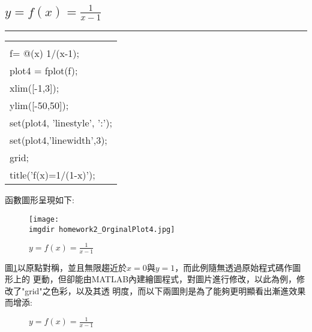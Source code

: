 		\subsection{$y=f(x)=\frac{1}{x-1}$}%
		\rule{\textwidth}{0.2pt}
		\begin{center}\colorbox{slight}{
				\begin{tabular}{p{}}
					\MJHmarker{\textbf{MATLAB語法 :}}\\					
					f= @(x) 1/(x-1);\\
					plot4 = fplot(f);\\
					xlim([-1,3]);\\
					ylim([-50,50]);\\
					set(plot4, 'linestyle', ':'); \\
					set(plot4,'linewidth',3);\\
					grid;\\
					title('f(x)=1/(1-x)');\\
				\end{tabular}
			}
			\end{center}			
		\bigskip
		函數圖形呈現如下:	
		\begin{figure}[H]	
		 	 \centering	 			 	 
   			 \texttt{[image: \\imgdir homework2\_OrginalPlot4.jpg]} 
   			 \caption{$y=f(x)=\frac{1}{x-1}$}   		
   			 \label{plot4}   			 		 
		\end{figure}
		\bigskip
		圖\ref{plot4}以原點對稱，並且無限趨近於$x=0$與$y=1$，而此例隨無透過原始程式碼作圖形上的			更動，但卻能由MATLAB內建繪圖程式，對圖片進行修改，以此為例，修改了"grid"之色彩，以及其透			明度，而以下兩圖則是為了能夠更明顯看出漸進效果而增添:
		\begin{figure}[H]
    		 \centering
   			 \caption{$y=f(x)=\frac{1}{x-1}$}
   			 \label{plot4_updown}
		\end{figure}
		\newpage
